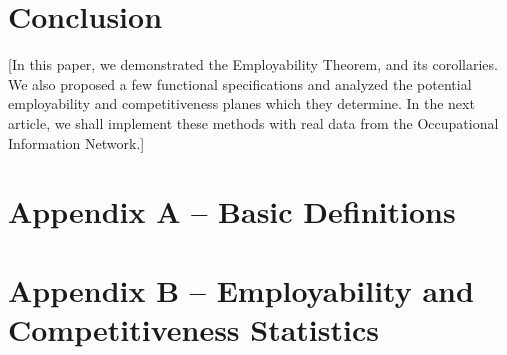 \documentclass[nonatbib]{elsarticle}
\begin{document}

\section{Conclusion}
[In this paper, we demonstrated the Employability Theorem, and its corollaries. We also proposed a few functional specifications and analyzed the potential employability and competitiveness planes which they determine. In the next article, we shall implement these methods with real data from the Occupational Information Network.]


\newpage
\printbibliography[
    heading=bibintoc,
    title={References}
]


\newpage
\section*{Appendix A -- Basic Definitions}

\section*{Appendix B -- Employability and Competitiveness Statistics}

\end{document}

